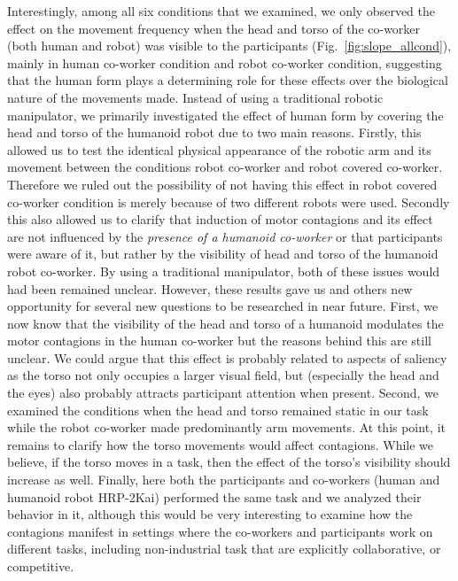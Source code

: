 Interestingly, among all six conditions that we examined, we only observed the effect on the movement frequency when the head and torso of the co-worker (both human and robot) was visible to the participants (Fig.~\ref{fig:slope_allcond}), mainly in human co-worker condition and robot co-worker condition, suggesting that the human form plays a determining role for these effects over the biological nature of the movements made. Instead of using a traditional robotic manipulator,  we primarily investigated the effect of human form by covering the head and torso of the humanoid robot due to two main reasons. Firstly, this allowed us to test the identical physical appearance of the robotic arm and its movement between the conditions robot co-worker and robot covered co-worker. Therefore we ruled out the possibility of not having this effect in robot covered co-worker condition is merely because of two different robots were used. Secondly this also allowed us to clarify that induction of motor contagions and its effect are not influenced by the \textit{presence of a humanoid co-worker} or that participants were aware of it, but rather by the visibility of head and torso of the humanoid robot co-worker. By using a traditional manipulator, both of these issues would had been remained unclear. However, these results gave us and others new opportunity for several new questions to be researched in near future. First, we now know that the visibility of the head and torso of a humanoid modulates the motor contagions in the human co-worker but the reasons behind this are still unclear. We could argue that this effect is probably related to aspects of saliency as the torso not only occupies a larger visual field, but (especially the head and the eyes) also probably attracts participant attention when present. Second, we examined the conditions when the head and torso remained static in our task while the robot co-worker made predominantly arm movements. At this point, it remains to clarify how the torso movements would affect contagions. While we believe, if the torso moves in a task, then the effect of the torso's visibility should increase as well. Finally, here both the participants and co-workers (human and humanoid robot HRP-2Kai) performed the same task and we analyzed their behavior in it, although this would be very interesting to examine how the contagions manifest in settings where the co-workers and participants work on different tasks, including non-industrial task that are explicitly collaborative, or competitive.


